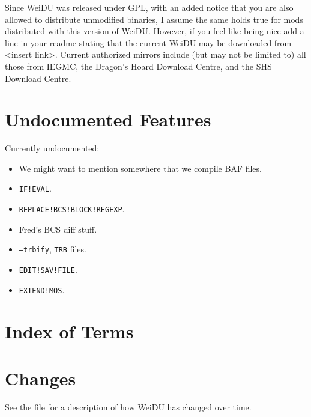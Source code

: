 \documentclass{article}
\def\t#1{{\tt #1}}
\begin{document}
Since WeiDU was released under GPL, with an added notice that you are also
allowed to distribute unmodified binaries, I assume the same holds true for
mods distributed with this version of WeiDU. However, if you feel like being
nice add a line in your readme stating that the current WeiDU may be downloaded
from <insert link>. Current authorized mirrors include (but may not be limited to)
all those from IEGMC, the Dragon's Hoard Download Centre, and the SHS Download Centre.

\section{Undocumented Features}

Currently undocumented:
\begin{itemize}
\item We might want to mention somewhere that we compile BAF files.
\item {\tt IF!EVAL}.
\item {\tt REPLACE!BCS!BLOCK!REGEXP}.
\item Fred's BCS diff stuff.
\item {\tt --trbify}, \t{TRB} files.
\item {\tt EDIT!SAV!FILE}.
\item {\tt EXTEND!MOS}.
\end{itemize}

\section{Index of Terms}

\printindex

\section{Changes}
See the file
for a description of how WeiDU
has changed over time.
\end{document}
